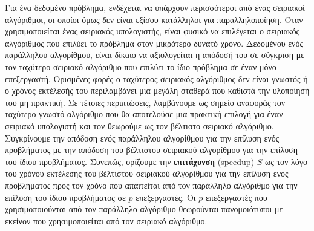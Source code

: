 \documentclass[12pt,a4paper]{article} %
\begin{document}
Για ένα δεδομένο πρόβλημα, ενδέχεται να υπάρχουν περισσότεροι από ένας
σειριακοί αλγόριθμοι, οι οποίοι όμως δεν είναι εξίσου κατάλληλοι για
παραλληλοποίηση. Όταν χρησιμοποιείται ένας σειριακός υπολογιστής, είναι
φυσικό να επιλέγεται ο σειριακός αλγόριθμος που επιλύει το πρόβλημα στον
μικρότερο δυνατό χρόνο. Δεδομένου ενός παράλληλου αλγορίθμου, είναι
δίκαιο να αξιολογείται η απόδοσή του σε σύγκριση με τον ταχύτερο
σειριακό αλγόριθμο που επιλύει το ίδιο πρόβλημα σε έναν μόνο
επεξεργαστή. Ορισμένες φορές ο ταχύτερος σειριακός αλγόριθμος δεν είναι
γνωστός ή ο χρόνος εκτέλεσής του περιλαμβάνει μια μεγάλη σταθερά που
καθιστά την υλοποίησή του μη πρακτική. Σε τέτοιες περιπτώσεις,
λαμβάνουμε ως σημείο αναφοράς τον ταχύτερο γνωστό αλγόριθμο που θα
αποτελούσε μια πρακτική επιλογή για έναν σειριακό υπολογιστή και τον
θεωρούμε ως τον βέλτιστο σειριακό αλγόριθμο. Συγκρίνουμε την απόδοση
ενός παράλληλου αλγορίθμου για την επίλυση ενός προβλήματος με την
απόδοση του βέλτιστου σειριακού αλγορίθμου για την επίλυση του ίδιου
προβλήματος. Συνεπώς, ορίζουμε την \textbf{επιτάχυνση}
(speedup) $S$ ως τον λόγο του χρόνου
εκτέλεσης του βέλτιστου σειριακού αλγορίθμου για την επίλυση ενός
προβλήματος προς τον χρόνο που απαιτείται από τον παράλληλο αλγόριθμο
για την επίλυση του ίδιου προβλήματος σε $p$ επεξεργαστές. Οι $p$
επεξεργαστές που χρησιμοποιούνται από τον παράλληλο αλγόριθμο
θεωρούνται πανομοιότυποι με εκείνον που χρησιμοποιείται από τον
σειριακό αλγόριθμο.
\end{document}
